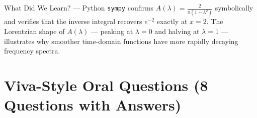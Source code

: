 \documentclass[12pt,a4paper]{article}
\begin{document}
\begin{learnbox}{What Did We Learn? --- Python}
\texttt{sympy} confirms $A(\lambda)=\frac{2}{\pi(1+\lambda^2)}$ symbolically and verifies that the inverse integral recovers $e^{-2}$ exactly at $x=2$. The Lorentzian shape of $A(\lambda)$ --- peaking at $\lambda=0$ and halving at $\lambda=1$ --- illustrates why smoother time-domain functions have more rapidly decaying frequency spectra.
\end{learnbox}

\section{Viva-Style Oral Questions (8 Questions with Answers)}
\end{document}

